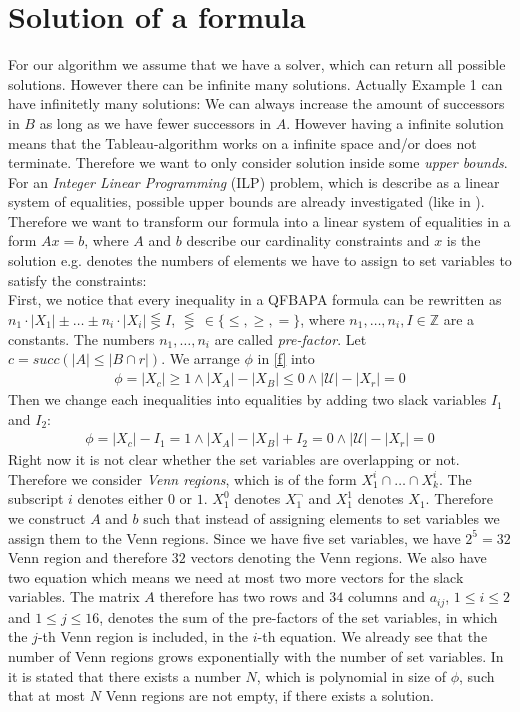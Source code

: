 \documentclass{book}
\theoremstyle{break}
\theoremstyle{definition}
\begin{document}
\section{Solution of a formula}
For our algorithm we assume that we have a solver, which can return all possible solutions. However there can be infinite many solutions. Actually Example 1 can have infinitetly many solutions: We can always increase the amount of successors in $B$ as long as we have fewer successors in $A$. However having a infinite solution means that the Tableau-algorithm works on a infinite space and/or does not terminate. Therefore we want to only consider solution inside some \textit{upper bounds}. For an \textit{Integer Linear Programming} (ILP) problem, which is describe as a linear system of equalities, possible upper bounds are already investigated (like in \cite{knapsack}). Therefore we want to transform our formula into a linear system of equalities in a form $Ax=b$, where $A$ and $b$ describe our cardinality constraints and $x$ is the solution e.g. denotes the numbers of elements we have to assign to set variables to satisfy the constraints:\\
First, we notice that every inequality in a QFBAPA formula can be
rewritten as $n_1\cdot|X_1|\pm \dots \pm n_i\cdot|X_i|\lesseqgtr I$, $\lesseqgtr\,\in\{\leq,\geq,=\}$, where $n_1,\dots, n_i,I\in\mathbb{Z}$ are a constants. The numbers $n_1,\dots,n_i$ are called \textit{pre-factor}. Let $c={succ(|A|\leq |B\cap r|)}$. We arrange $\phi$ in \eqref{f} into
\begin{align*}
\phi=|X_{c}|\geq 1\wedge |X_A|- |X_B|\leq 0 \wedge |\mathcal{U}|-|X_r|=0
\end{align*} 
Then we change each inequalities into equalities by adding two slack variables $I_1$ and $I_2$:
\begin{align*}
\phi=|X_{c}|- I_1= 1\wedge |X_A|-|X_B|+I_2= 0 \wedge |\mathcal{U}|-|X_r|=0
\end{align*}
Right now it is not clear whether the set variables are overlapping or not. Therefore we consider \textit{Venn regions}, which is of the form $X^i_1\cap \dots \cap X^i_k$. The subscript $i$ denotes either $0$ or $1$. $X^0_1$ denotes $X^\neg_1$ and $X^1_1$ denotes $X_1$. Therefore we construct $A$ and $b$ such that instead of assigning elements to set variables we assign them to the Venn regions. Since we have five set variables, we have $2^5=32$ Venn region and therefore $32$ vectors denoting the Venn regions. We also have two equation which means we need at most two more vectors for the slack variables. The matrix $A$ therefore has two rows and $34$ columns and $a_{ij}$, $1\leq i\leq 2$ and $1\leq j\leq 16$, denotes the sum of the pre-factors of the set variables, in which the $j$-th Venn region is included, in the $i$-th equation. We already see that the number of Venn regions grows exponentially with the number of set variables. In \cite{4} it is stated that there exists a number $N$, which is polynomial in size of $\phi$, such that at most $N$ Venn regions are not empty, if there exists a solution.
\end{document}
